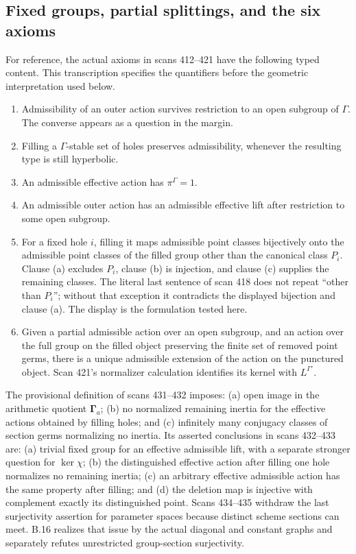\documentclass[11pt,oneside]{article}
\begin{document}
\subsection{Fixed groups, partial splittings, and the six axioms}

For reference, the actual axioms in scans 412--421 have the following
typed content.  This transcription specifies the quantifiers before
the geometric interpretation used below.
\begin{enumerate}
\item Admissibility of an outer action survives restriction to an open
subgroup of $\Gamma$.  The converse appears as a question in the margin.
\item Filling a $\Gamma$-stable set of holes preserves admissibility,
whenever the resulting type is still hyperbolic.
\item An admissible effective action has $\pi^\Gamma=1$.
\item An admissible outer action has an admissible effective lift
after restriction to some open subgroup.
\item For a fixed hole $i$, filling it maps admissible point classes
bijectively onto the admissible point classes of the filled group
other than the canonical class $P_i$.  Clause (a) excludes $P_i$,
clause (b) is injection, and clause (c) supplies the remaining classes.
The literal last sentence of scan 418 does not repeat ``other than
$P_i$''; without that exception it contradicts the displayed bijection
and clause (a).  The display is the formulation tested here.
\item Given a partial admissible action over an open subgroup,
and an action over the full group on the filled object preserving
the finite set of removed point germs, there is a unique admissible
extension of the action on the punctured object.  Scan 421's
normalizer calculation identifies its kernel with $L^{\Gamma'}$.
\end{enumerate}
The provisional definition of scans 431--432 imposes: (a) open image
in the arithmetic quotient $\boldsymbol\Gamma_a$; (b) no normalized
remaining inertia for the effective actions obtained by filling holes;
and (c) infinitely many conjugacy classes of section germs normalizing
no inertia.  Its asserted conclusions in scans 432--433 are:
(a) trivial fixed group for an effective admissible lift, with a
separate stronger question for $\ker\chi$; (b) the distinguished
effective action after filling one hole normalizes no remaining
inertia; (c) an arbitrary effective admissible action has the same
property after filling; and (d) the deletion map is injective with
complement exactly its distinguished point.  Scans 434--435 withdraw
the last surjectivity assertion for parameter spaces because distinct
scheme sections can meet.  B.16 realizes that issue by the actual
diagonal and constant graphs and separately refutes unrestricted
group-section surjectivity.
\end{document}
